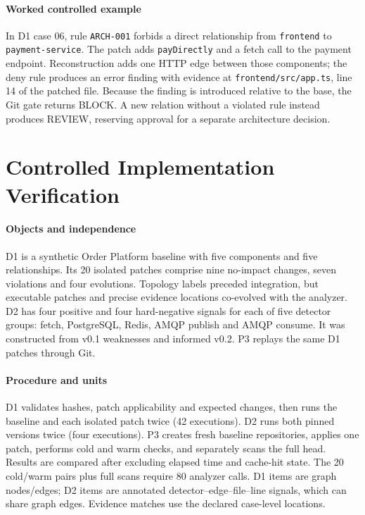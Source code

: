 \begin{sloppypar}
\paragraph{Worked controlled example} In D1 case 06, rule \texttt{ARCH-001} forbids a direct relationship from \texttt{frontend} to \texttt{payment-service}. The patch adds \texttt{payDirectly} and a fetch call to the payment endpoint. Reconstruction adds one HTTP edge between those components; the deny rule produces an error finding with evidence at \texttt{frontend/src/app.ts}, line 14 of the patched file. Because the finding is introduced relative to the base, the Git gate returns BLOCK. A new relation without a violated rule instead produces REVIEW, reserving approval for a separate architecture decision.
\end{sloppypar}

\section{Controlled Implementation Verification}\label{sec:evaluation}
\paragraph{Objects and independence} D1 is a synthetic Order Platform baseline with five components and five relationships. Its 20 isolated patches comprise nine no-impact changes, seven violations and four evolutions. Topology labels preceded integration, but executable patches and precise evidence locations co-evolved with the analyzer. D2 has four positive and four hard-negative signals for each of five detector groups: fetch, PostgreSQL, Redis, AMQP publish and AMQP consume. It was constructed from v0.1 weaknesses and informed v0.2. P3 replays the same D1 patches through Git.

\paragraph{Procedure and units} D1 validates hashes, patch applicability and expected changes, then runs the baseline and each isolated patch twice (42 executions). D2 runs both pinned versions twice (four executions). P3 creates fresh baseline repositories, applies one patch, performs cold and warm checks, and separately scans the full head. Results are compared after excluding elapsed time and cache-hit state. The 20 cold/warm pairs plus full scans require 80 analyzer calls. D1 items are graph nodes/edges; D2 items are annotated detector--edge--file--line signals, which can share graph edges. Evidence matches use the declared case-level locations.

